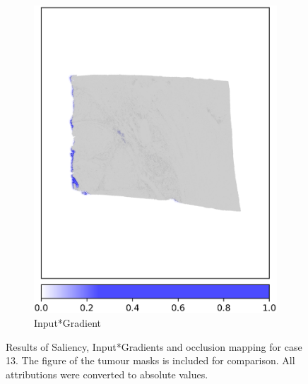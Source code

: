 \begin{figure}[h!t]
\begin{subfigure}[b]{0.49\textwidth}
         \includegraphics[width=\textwidth]{latex/captum/case13/inputXgradient_pos_case13-stain41-dead_2415days.png}
         \caption{Input*Gradient}
     \end{subfigure}
  
    \hfill
    \caption[Occlusion and Saliency for case 13  stain 41]{Results of Saliency, Input*Gradients and occlusion mapping for case 13. The figure of the tumour masks is included for comparison. All attributions were converted to absolute values.}
    \label{fig:case13b}
\end{figure}

